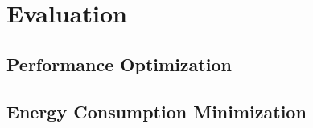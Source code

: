 \chapter{Evaluation}
\label{cha:evaluation}

\section{Performance Optimization}
\label{sec:performanceEvaluation}

\section{Energy Consumption Minimization}
\label{sec:energyEvaluation}
